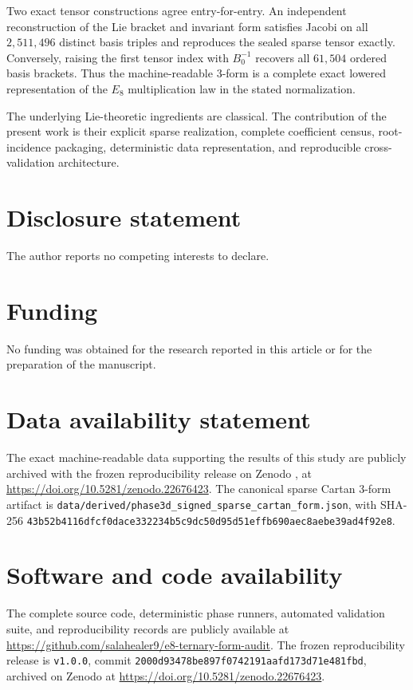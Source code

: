 \documentclass[11pt]{article}
\theoremstyle{definition}
\theoremstyle{remark}
\begin{document}
Two exact tensor constructions agree entry-for-entry.  An independent reconstruction of the Lie bracket and invariant form satisfies Jacobi on all $2{,}511{,}496$ distinct basis triples and reproduces the sealed sparse tensor exactly.  Conversely, raising the first tensor index with $B_0^{-1}$ recovers all $61{,}504$ ordered basis brackets.  Thus the machine-readable $3$-form is a complete exact lowered representation of the $E_8$ multiplication law in the stated normalization.

The underlying Lie-theoretic ingredients are classical.  The contribution of the present work is their explicit sparse realization, complete coefficient census, root-incidence packaging, deterministic data representation, and reproducible cross-validation architecture.


\section*{Disclosure statement}

The author reports no competing interests to declare.

\section*{Funding}

No funding was obtained for the research reported in this article or for the preparation of the manuscript.

\section*{Data availability statement}

The exact machine-readable data supporting the results of this study are publicly archived with the frozen reproducibility release on Zenodo \cite{Gherbi2026E8Audit}, at \url{https://doi.org/10.5281/zenodo.22676423}.  The canonical sparse Cartan 3-form artifact is \nolinkurl{data/derived/phase3d_signed_sparse_cartan_form.json}, with SHA-256 \nolinkurl{43b52b4116dfcf0dace332234b5c9dc50d95d51effb690aec8aebe39ad4f92e8}.

\section*{Software and code availability}

The complete source code, deterministic phase runners, automated validation suite, and reproducibility records are publicly available at \url{https://github.com/salahealer9/e8-ternary-form-audit}.  The frozen reproducibility release \cite{Gherbi2026E8Audit} is \texttt{v1.0.0}, commit \nolinkurl{2000d93478be897f0742191aafd173d71e481fbd}, archived on Zenodo at \url{https://doi.org/10.5281/zenodo.22676423}.
\end{document}
